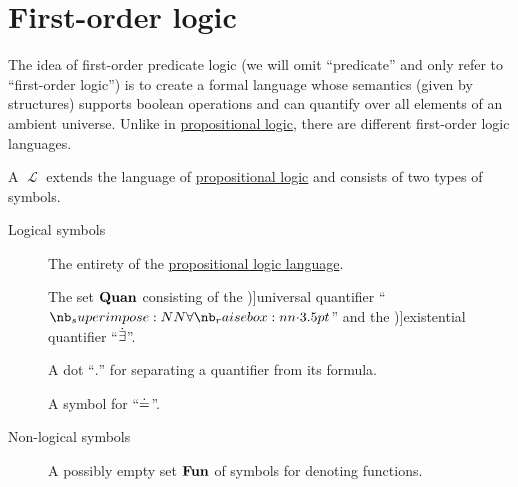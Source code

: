 \section{First-order logic}\label{sec:first_order_logic}

The idea of first-order predicate logic (we will omit \enquote{predicate} and only refer to \enquote{first-order logic}) is to create a formal language whose semantics (given by structures) supports boolean operations and can quantify over all elements of an ambient universe. Unlike in \hyperref[sec:propositional_logic]{propositional logic}, there are different first-order logic languages.

\begin{definition}\label{def:first_order_language}
  A  \( \mscrL \) extends the language of \hyperref[sec:propositional_logic]{propositional logic} and consists of two types of symbols.

  \begin{description}
    \item[Logical symbols]
    \hfill
    \begin{thmenum}[series=def:first_order_language]
       The entirety of the \hyperref[sec:propositional_logic]{propositional logic language}.

       The set \( \op*{Quan} \) consisting of the \term[ru=квантор общости (\cite[61]{Эдельман1975Логика})]{universal quantifier} \enquote{\( \synforall \)} and the \term[ru=квантор существования (\cite[61]{Эдельман1975Логика})]{existential quantifier} \enquote{\( \dot{\exists} \)}.

       A dot \enquote{\( . \)} for separating a quantifier from its formula.

       A symbol for  \enquote{\( \doteq \)}.
    \end{thmenum}

    \item[Non-logical symbols]
    \hfill
    \begin{thmenum}[resume=def:first_order_language]
       A possibly empty  set \( \op*{Fun} \) of symbols for denoting functions.


\end{thmenum}
\end{description}
\end{definition}
